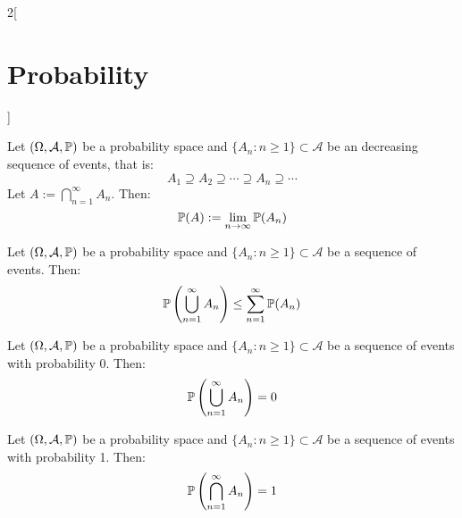 \documentclass[../../../main.tex]{subfiles}
\begin{document}
\begin{multicols}{2}[\section{Probability}]
  \begin{corollary}
    Let $(\Omega,\mathcal{A},\mathbb{P})$ be a probability space and $\{A_n:n\geq 1\}\subset\mathcal{A}$ be an decreasing sequence of events, that is: $$A_1\supseteq A_2\supseteq\cdots\supseteq A_n\supseteq\cdots$$ Let $A:=\bigcap_{n=1}^\infty A_n$. Then: $$\mathbb{P}(A):=\lim_{n\to\infty}\mathbb{P}(A_n)$$
  \end{corollary}
  \begin{prop}
    Let $(\Omega,\mathcal{A},\mathbb{P})$ be a probability space and $\{A_n:n\geq 1\}\subset\mathcal{A}$ be a sequence of events. Then: $$\mathbb{P}\left(\bigcup_{n=1}^\infty A_n\right)\leq\sum_{n=1}^\infty \mathbb{P}(A_n)$$
  \end{prop}
  \begin{corollary}
    Let $(\Omega,\mathcal{A},\mathbb{P})$ be a probability space and $\{A_n:n\geq 1\}\subset\mathcal{A}$ be a sequence of events with probability 0. Then: $$\mathbb{P}\left(\bigcup_{n=1}^\infty A_n\right)=0$$
  \end{corollary}
  \begin{corollary}
    Let $(\Omega,\mathcal{A},\mathbb{P})$ be a probability space and $\{A_n:n\geq 1\}\subset\mathcal{A}$ be a sequence of events with probability 1. Then: $$\mathbb{P}\left(\bigcap_{n=1}^\infty A_n\right)=1$$
  \end{corollary}

\end{multicols}
\end{document}
